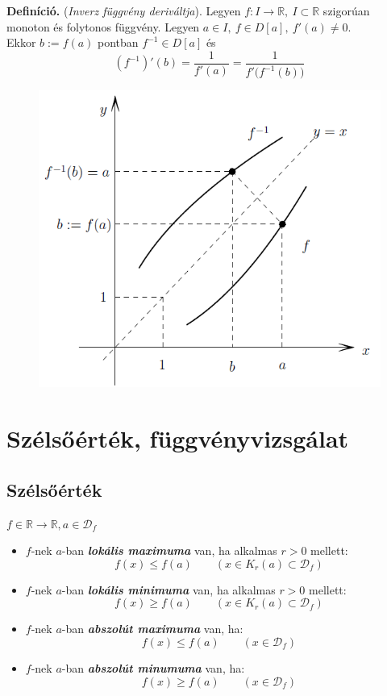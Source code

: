 \documentclass[12pt,margin=0px]{article}
\newcommand\ddfrac[2]{\frac{\displaystyle #1}{\displaystyle #2}}
\newcommand{\R}{\mathbb{R}}
\begin{document}
    \noindent \textbf{Definíció.} (\emph{Inverz függvény deriváltja}). Legyen $f:I \to \mathbb{R},\ I \subset \mathbb{R}$ szigorúan monoton és folytonos függvény. Legyen $a \in I,\ f \in D[a],\ f'(a) \neq 0$.\\
    Ekkor $b := f(a)$ pontban $f^{-1} \in D[a]$ és
    \[
        (f^{-1})'(b) = \ddfrac{1}{f'(a)} = \ddfrac{1}{f'\big(f^{-1}(b)\big)}
    \]

    \begin{figure}[H]
        \centering
        \includegraphics[width=0.6\linewidth]{img/diff_inv.png}
        \label{diff}
    \end{figure}
\newpage
	\section*{Szélsőérték, függvényvizsgálat}

	\subsection*{Szélsőérték}
	$ f \in \R \rightarrow \R, a \in \mathcal{D}_f$
	\begin{itemize}
		\item \noindent $f$-nek $a$-ban \textbf{\emph{lokális maximuma}} van, ha alkalmas $ r > 0$ mellett:
		\[ f(x) \leq f(a) \qquad (x\in K_{r}(a) \subset \mathcal{D}_f)\]
		\item \noindent $f$-nek $a$-ban \textbf{\emph{lokális minimuma}} van, ha alkalmas $ r > 0$ mellett:
		\[ f(x) \geq f(a) \qquad (x\in K_{r}(a) \subset \mathcal{D}_f)\]
		\item \noindent $f$-nek $a$-ban \textbf{\emph{abszolút maximuma}} van, ha:
		\[ f(x) \leq f(a) \qquad (x\in \mathcal{D}_f)\]
		\item \noindent $f$-nek $a$-ban \textbf{\emph{abszolút minumuma}} van, ha:
		\[ f(x) \geq f(a) \qquad (x\in \mathcal{D}_f)\]
        \end{itemize}
\end{document}
